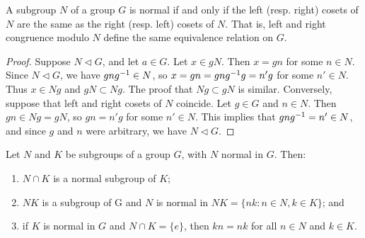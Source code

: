 \begin{theorem}
    A subgroup \(N\) of a group \(G\) is normal if and only if the left (resp.
    right) cosets of \(N\) are the same as the right (resp. left) cosets of
    \(N\). That is, left and right congruence modulo \(N\) define the same
    equivalence relation on \(G\).
\end{theorem}

\begin{proof}
    Suppose \(N \triangleleft G\), and let \(a \in G\). Let \(x \in gN\). Then
    \(x = gn\) for some \(n \in N\). Since \(N \triangleleft G\), we have
    \(gng^{-1} \in N\), so \(x = gn = gng^{-1} g = n'g\) for some \(n' \in N\).
    Thus \(x \in Ng\) and \(gN \subset Ng\). The proof that \(Ng \subset gN\) is
    similar. Conversely, suppose that left and right cosets of \(N\) coincide.
    Let \(g \in G\) and \(n \in N\). Then \(gn \in Ng = gN\), so \(gn = n'g\)
    for some \(n' \in N\). This implies that \(gng^{-1} = n' \in N\), and since
    \(g\) and \(n\) were arbitrary, we have \(N \triangleleft G\).
\end{proof}

\begin{theorem}
    \label{thm:normal-subgroup-props}
    Let \(N\) and \(K\) be subgroups of a group \(G\), with \(N\) normal in
    \(G\). Then:
    \begin{enumerate}[label=(\alph*)]
        \item \(N \cap K\) is a normal subgroup of \(K\);
        \item \(NK\) is a subgroup of G and \(N\) is normal in \(NK = \{nk : n
        \in N, k \in K\}\); and
        \item if \(K\) is normal in \(G\) and \(N \cap K = \{e\}\), then \(kn =
        nk\) for all \(n \in N\) and \(k \in K\).
    \end{enumerate}
\end{theorem}

